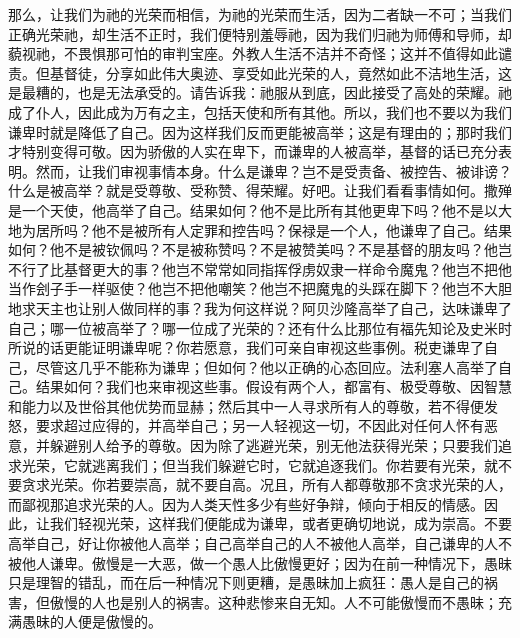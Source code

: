 那么，让我们为祂的光荣而相信，为祂的光荣而生活，因为二者缺一不可；当我们正确光荣祂，却生活不正时，我们便特别羞辱祂，因为我们归祂为师傅和导师，却藐视祂，不畏惧那可怕的审判宝座。外教人生活不洁并不奇怪；这并不值得如此谴责。但基督徒，分享如此伟大奥迹、享受如此光荣的人，竟然如此不洁地生活，这是最糟的，也是无法承受的。请告诉我：祂服从到底，因此接受了高处的荣耀。祂成了仆人，因此成为万有之主，包括天使和所有其他。所以，我们也不要以为我们谦卑时就是降低了自己。因为这样我们反而更能被高举；这是有理由的；那时我们才特别变得可敬。因为骄傲的人实在卑下，而谦卑的人被高举，基督的话已充分表明。然而，让我们审视事情本身。什么是谦卑？岂不是受责备、被控告、被诽谤？什么是被高举？就是受尊敬、受称赞、得荣耀。好吧。让我们看看事情如何。撒殚是一个天使，他高举了自己。结果如何？他不是比所有其他更卑下吗？他不是以大地为居所吗？他不是被所有人定罪和控告吗？保禄是一个人，他谦卑了自己。结果如何？他不是被钦佩吗？不是被称赞吗？不是被赞美吗？不是基督的朋友吗？他岂不行了比基督更大的事？他岂不常常如同指挥俘虏奴隶一样命令魔鬼？他岂不把他当作刽子手一样驱使？他岂不把他嘲笑？他岂不把魔鬼的头踩在脚下？他岂不大胆地求天主也让别人做同样的事？我为何这样说？阿贝沙隆高举了自己，达味谦卑了自己；哪一位被高举了？哪一位成了光荣的？还有什么比那位有福先知论及史米时所说的话更能证明谦卑呢？你若愿意，我们可亲自审视这些事例。税吏谦卑了自己，尽管这几乎不能称为谦卑；但如何？他以正确的心态回应。法利塞人高举了自己。结果如何？我们也来审视这些事。假设有两个人，都富有、极受尊敬、因智慧和能力以及世俗其他优势而显赫；然后其中一人寻求所有人的尊敬，若不得便发怒，要求超过应得的，并高举自己；另一人轻视这一切，不因此对任何人怀有恶意，并躲避别人给予的尊敬。因为除了逃避光荣，别无他法获得光荣；只要我们追求光荣，它就逃离我们；但当我们躲避它时，它就追逐我们。你若要有光荣，就不要贪求光荣。你若要崇高，就不要自高。况且，所有人都尊敬那不贪求光荣的人，而鄙视那追求光荣的人。因为人类天性多少有些好争辩，倾向于相反的情感。因此，让我们轻视光荣，这样我们便能成为谦卑，或者更确切地说，成为崇高。不要高举自己，好让你被他人高举；自己高举自己的人不被他人高举，自己谦卑的人不被他人谦卑。傲慢是一大恶，做一个愚人比傲慢更好；因为在前一种情况下，愚昧只是理智的错乱，而在后一种情况下则更糟，是愚昧加上疯狂：愚人是自己的祸害，但傲慢的人也是别人的祸害。这种悲惨来自无知。人不可能傲慢而不愚昧；充满愚昧的人便是傲慢的。\par

